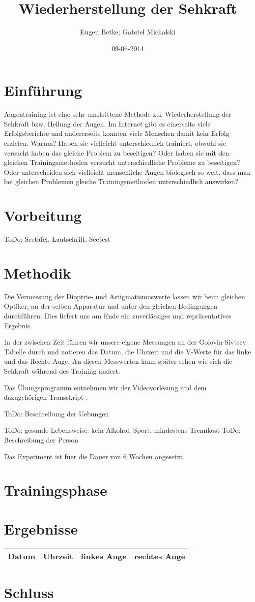 \documentclass[a4paper,10pt,twoside,notitlepage,twocolumn]{article}
\author{Eugen Betke; Gabriel Michalski}
\title{Wiederherstellung der Sehkraft}
\date{09-06-2014}
\begin{document}
\maketitle
\section{Einführung}
Augentraining ist eine sehr umstrittene Methode zur Wiederherstellung der Sehkraft bzw. Heilung der Augen. Im Internet gibt es einerseits viele Erfolgsberichte und andererseits konnten viele Menschen damit kein Erfolg erzielen. Warum? Haben sie vielleicht unterschiedlich trainiert, obwohl sie versucht haben das gleiche Problem zu beseitigen? Oder haben sie mit den gleichen Trainingsmethoden versucht unterschiedliche Probleme zu beseitigen? Oder unterscheiden sich vielleicht menschliche Augen biologisch so weit, dass man bei gleichen Problemen gleiche Trainingsmethoden unterschiedlich auswirken? 

\section{Vorbeitung}
ToDo: Seetafel, Lautschrift, Seetest

\section{Methodik}
Die Vermessung der Dioptrie- und Astigmatismuswerte lassen wir beim gleichen Optiker, an der selben Apparatur und unter den gleichen Bedingungen durchführen. Dies liefert uns am Ende ein zuverlässiges und repräsentatives Ergebnis.

In der zwischen Zeit führen wir unsere eigene Messungen an der Golovin-Sivtsev Tabelle durch und notieren das Datum, die Uhrzeit und die V-Werte für das linke und das Rechte Auge. An diesen Messwerten kann später sehen wie sich die Sehkraft während des Training ändert.

Das Übungsprogramm entnehmen wir der Videovorlesung \cite{lection} und dem dazugehörigen Transskript \cite{transscript}.

ToDo: Beschreibung der Uebungen

ToDo: gesunde Lebensweise: kein Alkohol, Sport, mindestens Trennkost
ToDo: Beschreibung der Person

Das Experiment ist fuer die Dauer von 6 Wochen angesetzt.

\section{Trainingsphase}

\section{Ergebnisse}
\begin{table}
	\begin{tabular}{llll}
	\hline
	Datum & Uhrzeit & linkes Auge & rechtes Auge \\
	\hline
	\end{tabular}
\end{table}

\section{Schluss}



\end{document}
